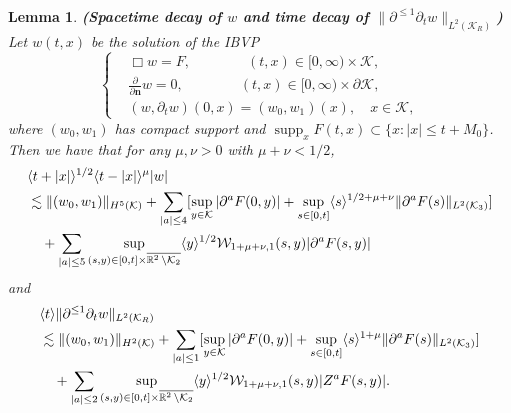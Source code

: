 \documentclass[11pt,twoside]{article}
\def\cK{\mathcal K}
\def\cW{\mathcal W}
\def\R{\mathop{\mathbb R\kern 0pt}\nolimits}
\def\supp{\mathop{\rm supp}\nolimits}
\def\p{\partial}
\def\supp{\operatorname{supp}}
\def\ls{\lesssim}
\def\bn{\mathbf{n}}
\newcommand{\w}[1]{\langle {#1} \rangle}
\theoremstyle{plain}
\newtheorem{lemma}[theorem]{Lemma}
\theoremstyle{definition}
\numberwithin{equation}{section}
\begin{document}
\begin{lemma}
{\bf (Spacetime decay of $w$ and time decay of $\|\p^{\le1}\p_tw\|_{L^2(\cK_R)}$)}
Let $w(t,x)$ be the solution of the IBVP
\begin{equation*}
\left\{
\begin{aligned}
&\Box w=F,\qquad \qquad(t,x)\in[0,\infty)\times\cK,\\
&\frac{\p}{\p\bn}w=0,\qquad\qquad (t,x)\in[0,\infty)\times\p\cK,\\
&(w,\p_tw)(0,x)=(w_0,w_1)(x),\quad x\in\cK,
\end{aligned}
\right.
\end{equation*}
where $(w_0,w_1)$ has compact support and $\supp_x F(t,x)\subset\{x: |x|\le t+M_0\}$.
Then we have that for any $\mu,\nu>0$ with $\mu+\nu<1/2$,
\begin{equation}\label{pw:ibvp}
\begin{split}
&\w{t+|x|}^{1/2}\w{t-|x|}^{\mu}|w|\\
&\ls\|(w_0,w_1)\|_{H^5(\cK)}
+\sum_{|a|\le4}[\sup_{y\in\cK}|\p^aF(0,y)|+\sup_{s\in[0,t]}\w{s}^{1/2+\mu+\nu}\|\p^aF(s)\|_{L^2(\cK_3)}]\\
&\quad +\sum_{|a|\le5}\sup_{(s,y)\in[0,t]\times\overline{\R^2\setminus\cK_2}}\w{y}^{1/2}\cW_{1+\mu+\nu,1}(s,y)|\p^aF(s,y)|
\end{split}
\end{equation}
and
\begin{equation}\label{locdt}
\begin{split}
&\w{t}\|\p^{\le1}\p_tw\|_{L^2(\cK_R)}\\
&\ls\|(w_0,w_1)\|_{H^2(\cK)}
+\sum_{|a|\le1}[\sup_{y\in\cK}|\p^aF(0,y)|+\sup_{s\in[0,t]}\w{s}^{1+\mu}\|\p^aF(s)\|_{L^2(\cK_3)}]\\
&\quad +\sum_{|a|\le2}\sup_{(s,y)\in[0,t]\times\overline{\R^2\setminus\cK_2}}\w{y}^{1/2}\cW_{1+\mu+\nu,1}(s,y)|Z^aF(s,y)|.
\end{split}
\end{equation}
\end{lemma}
\end{document}
